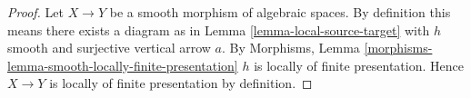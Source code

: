 \documentclass[10pt,a4paper]{amsart}
\theoremstyle{plain}
\theoremstyle{definition}
\theoremstyle{remark}
\numberwithin{equation}{subsection}
\begin{document}
\begin{proof}
Let $X \to Y$ be a smooth morphism of algebraic spaces. By
definition this means there exists a diagram as in
Lemma \ref{lemma-local-source-target}
with $h$ smooth and surjective vertical arrow $a$. By
Morphisms, Lemma \ref{morphisms-lemma-smooth-locally-finite-presentation}
$h$ is locally of finite presentation. Hence $X \to Y$ is
locally of finite presentation by definition.
\end{proof}
\end{document}
